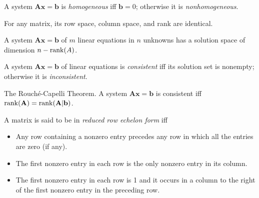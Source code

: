 \documentclass[../Notes.tex]{subfiles}
\begin{document}
\begin{definition}{}{}
    A system \(\mathbf{A}\mathbf{x}=\mathbf{b}\) is \emph{homogeneous} iff \(\mathbf{b}=0\); otherwise it is \emph{nonhomogeneous}.
\end{definition}
\begin{theorem}{}{}
    For any matrix, its row space, column space, and rank are identical.
\end{theorem}
\begin{theorem}{}{}
    A system \(\mathbf{A}\mathbf{x}=\mathbf{b}\) of \(m\) linear equations in \(n\) unknowns has a solution space of dimension \(n-\operatorname{rank}(A)\).
\end{theorem}
\begin{definition}{}{}
    A system \(\mathbf{A}\mathbf{x}=\mathbf{b}\) of linear equations is \emph{consistent} iff its solution set is nonempty; otherwise it is \emph{inconsistent}.
\end{definition}
\begin{theorem}{The Rouché-Capelli Theorem.}{}
    A system \(\mathbf{A}\mathbf{x}=\mathbf{b}\) is consistent iff \(\operatorname{rank}(\mathbf{A})=\operatorname{rank}(\mathbf{A}\vert \mathbf{b})\).
\end{theorem}
\begin{definition}{}{}
    A matrix is said to be in \emph{reduced row echelon form} iff
        \begin{itemize}
            \item Any row containing a nonzero entry precedes any row in which all the entries are zero (if any).
            \item The first nonzero entry in each row is the only nonzero entry in its column.
            \item The first nonzero entry in each row is 1 and it occurs in a column to the right of the first nonzero entry in the preceding row.
        \end{itemize}
\end{definition}
\end{document}
